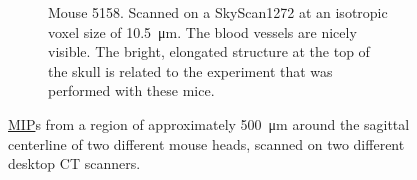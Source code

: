 \documentclass[a4paper]{exam}
\newlength\imagescale%
\newcommand{\uct}{{\textmu}CT\xspace}%
\begin{document}
\begin{questions}
\begin{figure}[h]
\begin{subfigure}{0.495\textwidth}
\begin{tikzpicture}[x=\imagescale,y=-\imagescale]
            \end{tikzpicture}%
            \caption{
                Mouse 5158.%
                Scanned on a SkyScan1272 at an isotropic voxel size of \qty{10.5}{\micro\meter}.
                The blood vessels are nicely visible.
                The bright, elongated structure at the top of the skull is related to the experiment that was performed with these mice.
            }%
            \label{fig:5158}%
        \end{subfigure}%
        \caption{\href{https://en.wikipedia.org/wiki/Maximum_intensity_projection}{MIP}s from a region of approximately \qty{500}{\micro\meter} around the sagittal centerline of two different mouse heads, scanned on two different desktop \uct scanners.}%
    \end{figure}

\end{questions}
\end{document}
